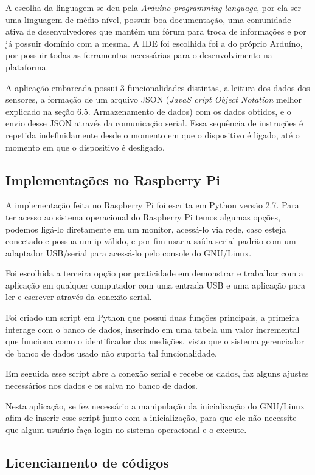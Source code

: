 \documentclass[final,12pt, times, 5p, twocolumn]{elsarticle}
\begin{document}
A escolha da linguagem se deu pela \textit{Arduino programming language}, por ela ser uma linguagem de médio nível, possuir boa documentação, uma comunidade ativa de desenvolvedores que mantém um fórum para troca de informações e por já possuir domínio com a mesma. A IDE foi escolhida foi a do próprio Arduíno, por possuir todas as ferramentas necessárias para o desenvolvimento na plataforma.

A aplicação embarcada possui 3 funcionalidades distintas, a leitura dos dados dos sensores, a formação de um arquivo JSON (\textit{JavaS
cript Object Notation} melhor explicado na seção 6.5. Armazenamento de dados) com os dados obtidos, e o envio desse JSON através da comunicação serial. Essa sequência de instruções é repetida indefinidamente desde o momento em que o dispositivo é ligado, até o momento em que o dispositivo é desligado.

\subsection{Implementações no Raspberry Pi}

A implementação feita no Raspberry Pi foi escrita em Python versão 2.7. Para ter acesso ao sistema operacional do Raspberry Pi temos algumas opções, podemos ligá-lo diretamente em um monitor, acessá-lo via rede, caso esteja conectado e possua um ip válido, e por fim usar a saída serial padrão com um adaptador USB/serial para acessá-lo pelo console do GNU/Linux.

Foi escolhida a terceira opção por praticidade em demonstrar e trabalhar com a aplicação em qualquer computador com uma entrada USB e uma aplicação para ler e escrever através da conexão serial.

Foi criado um script em Python que possui duas funções principais, a primeira interage com o banco de dados, inserindo em uma tabela um valor incremental que funciona como o identificador das medições, visto que o sistema gerenciador de banco de dados usado não suporta tal funcionalidade.

Em seguida esse script abre a conexão serial e recebe os dados, faz alguns ajustes necessários nos dados e os salva no banco de dados.

Nesta aplicação, se fez necessário a manipulação da inicialização do GNU/Linux afim de inserir esse script junto com a inicialização, para que ele não necessite que algum usuário faça login no sistema operacional e o execute.

\subsection{Licenciamento de códigos}
\end{document}
